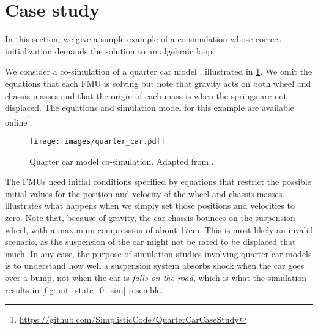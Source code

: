 \section{Case study}
\label{sec:case_study}
In this section, we give a simple example of a co-simulation whose correct initialization demands the solution to an algebraic loop.

We consider a co-simulation of a quarter car model \cite[Section 6.4]{Schramm2014}, illustrated in \cref{fig:quarter_car}.
We omit the equations that each FMU is solving but note that gravity acts on both wheel and chassis masses and that the origin of each mass is when the springs are not displaced.
The equations and simulation model for this example are available online\footnote{\url{https://github.com/SimplisticCode/QuarterCarCaseStudy}}. 

\begin{figure}[htb]
    \centering
    \texttt{[image: images/quarter\_car.pdf]}
    \caption{Quarter car model co-simulation. Adapted from \cite[Section 6.4]{Schramm2014}.}
    \label{fig:quarter_car}
\end{figure}

The FMUs need initial conditions specified by equations that restrict the possible initial values for the position and velocity of the wheel and chassis masses.
 illustrates what happens when we simply set those positions and velocities to zero.
Note that, because of gravity, the car chassis bounces on the suspension wheel, with a maximum compression of about 17cm. This is most likely an invalid scenario, as the suspension of the car might not be rated to be displaced that much. In any case, the purpose of simulation studies involving quarter car models is to understand how well a suspension system absorbs shock when the car goes over a bump, not when the car is \emph{falls on the road}, which is what the simulation results in \cref{fig:init_state_0_sim} resemble.

